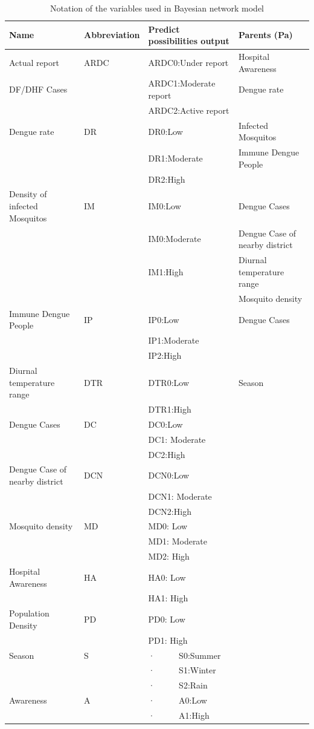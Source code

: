 \documentclass[review]{elsarticle}
\begin{document}
	\begin{table}[!htbp]
		\centering
		\normalsize
		\begin{tabular}{|l|l|l|l|}
			\hline
			Name & Abbreviation & Predict possibilities output & Parents (Pa)\\
			\hline
			Actual report & ARDC & ARDC0:Under report &  Hospital Awareness \\
			DF/DHF Cases &  & ARDC1:Moderate report &  Dengue rate\\
			&  & ARDC2:Active report & \\
			\hline
			Dengue rate & DR & DR0:Low &  Infected Mosquitos \\
			&  & DR1:Moderate &  Immune Dengue People\\
			&  & DR2:High & \\
			\hline
			Density of infected Mosquitos & IM & IM0:Low  &  Dengue Cases \\
			&  & IM0:Moderate &  Dengue Case of nearby district\\
			&  & IM1:High &  Diurnal temperature range\\
			&  &  &  Mosquito density\\
			\hline
			Immune Dengue People & IP & IP0:Low &  Dengue Cases \\
			&  & IP1:Moderate & \\
			&  & IP2:High & \\
			\hline
			Diurnal temperature range & DTR & DTR0:Low &  Season \\
			&  & DTR1:High & \\
			\hline
			Dengue Cases & DC & DC0:Low & \\
			&  & DC1: Moderate & \\
			&  & DC2:High & \\
			\hline
			Dengue Case of nearby district & DCN & DCN0:Low & \\
			&  & DCN1: Moderate & \\
			&  & DCN2:High & \\
			\hline
			Mosquito density & MD & MD0: Low & \\
			&  & MD1: Moderate & \\
			&  & MD2: High & \\
			\hline
			Hospital Awareness & HA & HA0: Low & \\
			&  & HA1: High & \\
			\hline
			Population Density & PD & PD0: Low & \\
			&  & PD1: High & \\
			\hline
			Season & S & ·      S0:Summer & \\
			&  & ·      S1:Winter & \\
			&  & ·      S2:Rain & \\
			\hline 
			Awareness & A & ·      A0:Low & \\			
			&  & ·      A1:High & \\
			\hline
			
		\end{tabular}
		\caption{Notation of the variables used in Bayesian network model}
		\label{notation-bn2}
	\end{table}
	
\end{document}
